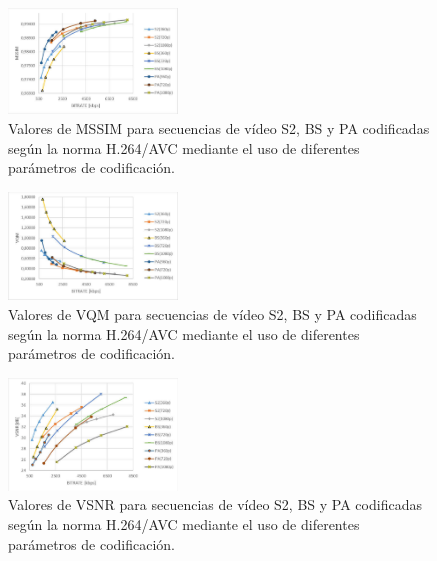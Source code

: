 \documentclass[conference]{IEEEtran}
\begin{document}
    \begin{figure}[H]
        \centering
        \includegraphics[width=0.4\textwidth]{img/fig4.png}
        \caption{Valores de MSSIM para secuencias de vídeo S2, BS y PA codificadas 
        según la norma H.264/AVC mediante el uso de diferentes parámetros de 
        codificación.}
        \label{figure4}
    \end{figure}

    \begin{figure}[H]
        \centering
        \includegraphics[width=0.4\textwidth]{img/fig5.png}
        \caption{Valores de VQM para secuencias de vídeo S2, BS y PA codificadas 
        según la norma H.264/AVC mediante el uso de diferentes parámetros de 
        codificación.}
        \label{figure5}
    \end{figure}

    \begin{figure}[H]
        \centering
        \includegraphics[width=0.4\textwidth]{img/fig6.png}
        \caption{Valores de VSNR para secuencias de vídeo S2, BS y PA codificadas 
        según la norma H.264/AVC mediante el uso de diferentes parámetros de 
        codificación.}
        \label{figure6}
    \end{figure}
\end{document}
